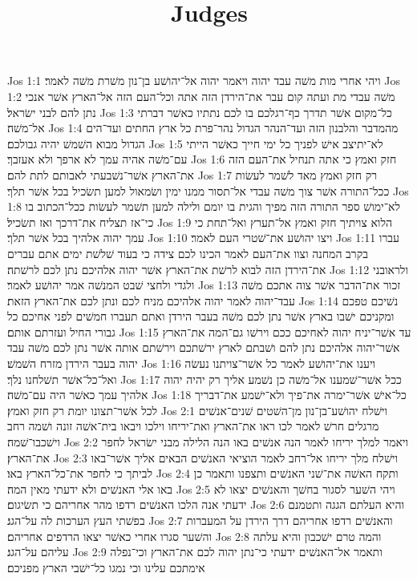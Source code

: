 

\title{Judges}

Jos 1:1  ויהי אחרי מות משׁה עבד יהוה ויאמר יהוה אל־יהושׁע בן־נון משׁרת משׁה לאמר׃
Jos 1:2  משׁה עבדי מת ועתה קום עבר את־הירדן הזה אתה וכל־העם הזה אל־הארץ אשׁר אנכי נתן להם לבני ישׂראל׃
Jos 1:3  כל־מקום אשׁר תדרך כף־רגלכם בו לכם נתתיו כאשׁר דברתי אל־משׁה׃
Jos 1:4  מהמדבר והלבנון הזה ועד־הנהר הגדול נהר־פרת כל ארץ החתים ועד־הים הגדול מבוא השׁמשׁ יהיה גבולכם׃
Jos 1:5  לא־יתיצב אישׁ לפניך כל ימי חייך כאשׁר הייתי עם־משׁה אהיה עמך לא ארפך ולא אעזבך׃
Jos 1:6  חזק ואמץ כי אתה תנחיל את־העם הזה את־הארץ אשׁר־נשׁבעתי לאבותם לתת להם׃
Jos 1:7  רק חזק ואמץ מאד לשׁמר לעשׂות ככל־התורה אשׁר צוך משׁה עבדי אל־תסור ממנו ימין ושׂמאול למען תשׂכיל בכל אשׁר תלך׃
Jos 1:8  לא־ימושׁ ספר התורה הזה מפיך והגית בו יומם ולילה למען תשׁמר לעשׂות ככל־הכתוב בו כי־אז תצליח את־דרכך ואז תשׂכיל׃
Jos 1:9  הלוא צויתיך חזק ואמץ אל־תערץ ואל־תחת כי עמך יהוה אלהיך בכל אשׁר תלך׃
Jos 1:10  ויצו יהושׁע את־שׁטרי העם לאמר׃
Jos 1:11  עברו בקרב המחנה וצוו את־העם לאמר הכינו לכם צידה כי בעוד שׁלשׁת ימים אתם עברים את־הירדן הזה לבוא לרשׁת את־הארץ אשׁר יהוה אלהיכם נתן לכם לרשׁתה׃
Jos 1:12  ולראובני ולגדי ולחצי שׁבט המנשׁה אמר יהושׁע לאמר׃
Jos 1:13  זכור את־הדבר אשׁר צוה אתכם משׁה עבד־יהוה לאמר יהוה אלהיכם מניח לכם ונתן לכם את־הארץ הזאת׃
Jos 1:14  נשׁיכם טפכם ומקניכם ישׁבו בארץ אשׁר נתן לכם משׁה בעבר הירדן ואתם תעברו חמשׁים לפני אחיכם כל גבורי החיל ועזרתם אותם׃
Jos 1:15  עד אשׁר־יניח יהוה לאחיכם ככם וירשׁו גם־המה את־הארץ אשׁר־יהוה אלהיכם נתן להם ושׁבתם לארץ ירשׁתכם וירשׁתם אותה אשׁר נתן לכם משׁה עבד יהוה בעבר הירדן מזרח השׁמשׁ׃
Jos 1:16  ויענו את־יהושׁע לאמר כל אשׁר־צויתנו נעשׂה ואל־כל־אשׁר תשׁלחנו נלך׃
Jos 1:17  ככל אשׁר־שׁמענו אל־משׁה כן נשׁמע אליך רק יהיה יהוה אלהיך עמך כאשׁר היה עם־משׁה׃
Jos 1:18  כל־אישׁ אשׁר־ימרה את־פיך ולא־ישׁמע את־דבריך לכל אשׁר־תצונו יומת רק חזק ואמץ׃
Jos 2:1  וישׁלח יהושׁע־בן־נון מן־השׁטים שׁנים־אנשׁים מרגלים חרשׁ לאמר לכו ראו את־הארץ ואת־יריחו וילכו ויבאו בית־אשׁה זונה ושׁמה רחב וישׁכבו־שׁמה׃
Jos 2:2  ויאמר למלך יריחו לאמר הנה אנשׁים באו הנה הלילה מבני ישׂראל לחפר את־הארץ׃
Jos 2:3  וישׁלח מלך יריחו אל־רחב לאמר הוציאי האנשׁים הבאים אליך אשׁר־באו לביתך כי לחפר את־כל־הארץ באו׃
Jos 2:4  ותקח האשׁה את־שׁני האנשׁים ותצפנו ותאמר כן באו אלי האנשׁים ולא ידעתי מאין המה׃
Jos 2:5  ויהי השׁער לסגור בחשׁך והאנשׁים יצאו לא ידעתי אנה הלכו האנשׁים רדפו מהר אחריהם כי תשׂיגום׃
Jos 2:6  והיא העלתם הגגה ותטמנם בפשׁתי העץ הערכות לה על־הגג׃
Jos 2:7  והאנשׁים רדפו אחריהם דרך הירדן על המעברות והשׁער סגרו אחרי כאשׁר יצאו הרדפים אחריהם׃
Jos 2:8  והמה טרם ישׁכבון והיא עלתה עליהם על־הגג׃
Jos 2:9  ותאמר אל־האנשׁים ידעתי כי־נתן יהוה לכם את־הארץ וכי־נפלה אימתכם עלינו וכי נמגו כל־ישׁבי הארץ מפניכם׃
